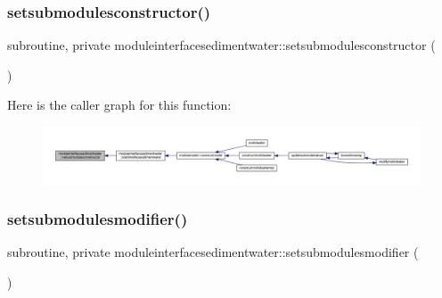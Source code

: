 \subsubsection{\texorpdfstring{setsubmodulesconstructor()}{setsubmodulesconstructor()}}
{\footnotesize\ttfamily subroutine, private moduleinterfacesedimentwater\+::setsubmodulesconstructor (\begin{DoxyParamCaption}{ }\end{DoxyParamCaption})\hspace{0.3cm}{\ttfamily [private]}}

Here is the caller graph for this function\+:\nopagebreak
\begin{figure}[H]
\begin{center}
\leavevmode
\includegraphics[width=350pt]{namespacemoduleinterfacesedimentwater_a5922862ceb22f053a7ddf81b53a0be8c_icgraph}
\end{center}
\end{figure}
\mbox{\label{namespacemoduleinterfacesedimentwater_ae902470f5fe9f7c4442249a86b00147e}} 
\subsubsection{\texorpdfstring{setsubmodulesmodifier()}{setsubmodulesmodifier()}}
{\footnotesize\ttfamily subroutine, private moduleinterfacesedimentwater\+::setsubmodulesmodifier (\begin{DoxyParamCaption}{ }\end{DoxyParamCaption})\hspace{0.3cm}{\ttfamily [private]}}

